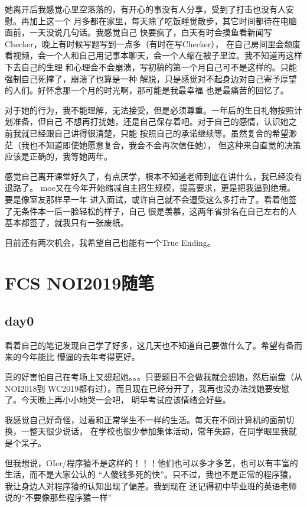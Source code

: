 她离开后我感觉心里空落落的，有开心的事没有人分享，受到了打击也没有人安慰。再加上这一个
月多都在家里，每天除了吃饭睡觉散步，其它时间都待在电脑面前，一天没说几句话。我感觉自己
快要疯了，白天有时会摸鱼看新闻写Checker，晚上有时候写题写到一点多（有时在写Checker），
在自己房间里会颓废看视频，会一个人和自己用记事本聊天，会一个人缩在被子里泣。我不知道再这样下去自己的生理
和心理会不会崩溃，写初稿的第一个月自己可不是这样的。只能强制自己死撑了，崩溃了也算是一种
解脱，只是感觉对不起身边对自己寄予厚望的人们。好怀念那一个月的时光啊，那可能是我最幸福
也是最痛苦的回忆了。

对于她的行为，我不能理解，无法接受，但是必须尊重。一年后的生日礼物按照计划准备，但自己
不想再打扰她，还是自己保存着吧。对于自己的感情，认识她之前我就已经跟自己讲得很清楚，只能
按照自己的承诺继续等。虽然复合的希望渺茫（我也不知道即使她愿意复合，我会不会再次信任她），
但这种来自直觉的决策应该是正确的，我等她两年。

感觉自己离开课堂好久了，有点厌学，根本不知道老师到底在讲什么，我已经没有退路了。
moe又在今年开始缩减自主招生规模，提高要求，更是把我逼到绝境。要是像室友那样早一年
进入面试，或许自己就不会遭受这么多打击了。看着他签了无条件本一后一脸轻松的样子，自己
很是羡慕，这两年省排名在自己左右的人基本都签了，就我只有一张废纸。

目前还有两次机会，我希望自己也能有一个True Ending。
\section{FCS NOI2019随笔}
\subsection{day0}
看着自己的笔记发现自己学了好多，这几天也不知道自己要做什么了。希望有备而来的今年能比
懵逼的去年考得更好。

真的好害怕自己在考场上又想起她。。。只要题目不会做我就会想她，然后崩盘（从NOI2018到
WC2019都有过）。而且现在已经分开了，我再也没办法找她要安慰了。今天晚上再小小地哭一会吧，
明早考试应该情绪会好些。

我感觉自己好奇怪，过着和正常学生不一样的生活。每天在不同计算机的面前切换，一整天很少说话，
在学校也很少参加集体活动，常年失踪，在同学眼里我就是个呆子。

但我想说，OIer/程序猿不是这样的！！！他们也可以多才多艺，也可以有丰富的生活，而不是大家公认的
``人傻钱多死的快''。只不过，我也不是正常的程序猿，我让身边人对程序猿的认知出现了偏差。我到现在
还记得初中毕业班的英语老师说的``不要像那些程序猿一样''

